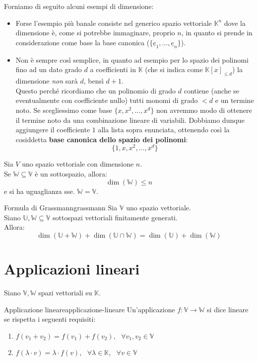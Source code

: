 \documentclass[12pt]{report}
\newcommand{\whitespace}{\text{ }}
\newcommand{\K}{\mathbb{K}}
\newcommand{\V}{\mathbb{V}}
\newcommand{\W}{\mathbb{W}}
\newcommand{\vectorspace}[1]{\mathbb{#1}}
\begin{document}
	Forniamo di seguito alcuni esempi di dimensione:
	\begin{itemize}
		\item Forse l'esempio più banale consiste nel generico spazio vettoriale $\K^n$ dove la dimensione è, come si potrebbe immaginare, proprio $n$, in quanto si prende in considerazione come base la base canonica ($\{\underline{e}_1, \dots, \underline{e}_n\}$).
		\item Non è sempre così semplice, in quanto ad esempio per lo spazio dei polinomi fino ad un dato grado $d$ a coefficienti in $\K$ (che si indica come $\K[x]_{\leq d}$) la dimensione \textit{non} sarà $d$, bensì $d+1$.\\
		Questo perché ricordiamo che un polinomio di grado $d$ contiene (anche se eventualmente con coefficiente nullo) tutti monomi di grado $< d$ e un termine noto. Se scegliessimo come base $\{x, x^2, \dots, x^d\}$ non avremmo modo di ottenere il termine noto da una combinazione lineare di variabili. Dobbiamo dunque aggiungere il coefficiente $1$ alla lista sopra enunciata, ottenendo così la cosiddetta \textbf{base canonica dello spazio dei polinomi}:
		\[
			\{1, x, x^2, \dots, x^d\}
		\]
	\end{itemize}
	
	\begin{proposizione}{}{}
		Sia $V$ uno spazio vettoriale con dimensione $n$.\\
		Se $\W \subseteq \V$ è un sottospazio, allora:
		\[
			\dim(\W) \leq n
		\]
		e si ha uguaglianza sse. $\W = \V$.
	\end{proposizione}
	
	\begin{teorema}{Formula di Grassmann}{grassmann}
		Sia $\V$ uno spazio vettoriale.\\
		Siano $\vectorspace{U}, \W \subseteq \V$ sottospazi vettoriali finitamente generati.\\
		Allora:
		\[
			\dim(\vectorspace{U} + \W) + \dim(\vectorspace{U} \cap \W) = \dim(\vectorspace{U}) + \dim(\W)
		\]
	\end{teorema}
	
	\newpage
	\chapter{Applicazioni lineari}
	
	Siano $\V, \W$ spazi vettoriali su $\K$.
	
	\begin{definizione}{Applicazione lineare}{applicazione-lineare}
		Un'applicazione $f: \V \to \W$ si dice lineare se rispetta i seguenti requisiti:
		\begin{enumerate}
			\item $f(v_1+v_2) = f(v_1) + f(v_2), \whitespace \forall v_1, v_2 \in \V$
			\item $f(\lambda\cdot v) = \lambda \cdot f(v), \whitespace \forall \lambda \in \K, \whitespace \forall v \in \V$
		\end{enumerate}
	\end{definizione}
	
\end{document}
